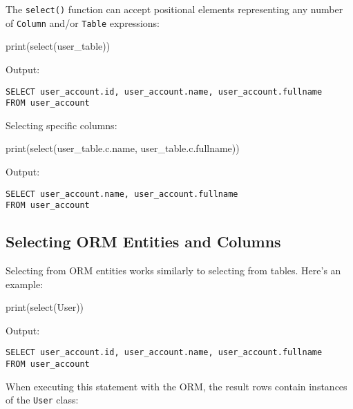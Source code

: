 \documentclass[
  letterpaper,
  DIV=11,
  numbers=noendperiod]{scrreprt}
\newenvironment{Shaded}{\begin{snugshade}}{\end{snugshade}}
\newcommand{\BuiltInTok}[1]{\textcolor[rgb]{0.00,0.23,0.31}{#1}}
\newcommand{\NormalTok}[1]{\textcolor[rgb]{0.00,0.23,0.31}{#1}}
\begin{document}
The \texttt{select()} function can accept positional elements
representing any number of \texttt{Column} and/or \texttt{Table}
expressions:

\begin{Shaded}
\begin{Highlighting}[]
\BuiltInTok{print}\NormalTok{(select(user\_table))}
\end{Highlighting}
\end{Shaded}

Output:

\begin{verbatim}
SELECT user_account.id, user_account.name, user_account.fullname
FROM user_account
\end{verbatim}

Selecting specific columns:

\begin{Shaded}
\begin{Highlighting}[]
\BuiltInTok{print}\NormalTok{(select(user\_table.c.name, user\_table.c.fullname))}
\end{Highlighting}
\end{Shaded}

Output:

\begin{verbatim}
SELECT user_account.name, user_account.fullname
FROM user_account
\end{verbatim}

\subsection{Selecting ORM Entities and
Columns}\label{selecting-orm-entities-and-columns}

Selecting from ORM entities works similarly to selecting from tables.
Here's an example:

\begin{Shaded}
\begin{Highlighting}[]
\BuiltInTok{print}\NormalTok{(select(User))}
\end{Highlighting}
\end{Shaded}

Output:

\begin{verbatim}
SELECT user_account.id, user_account.name, user_account.fullname
FROM user_account
\end{verbatim}

When executing this statement with the ORM, the result rows contain
instances of the \texttt{User} class:
\end{document}
